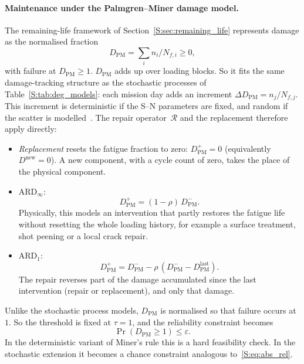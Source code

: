 \documentclass[11pt,a4paper]{article}
\theoremstyle{plain}
\theoremstyle{definition}
\theoremstyle{remark}
\begin{document}
\paragraph{Maintenance under the Palmgren--Miner damage model.}
The remaining-life framework of Section~\ref{S:sec:remaining_life} represents damage as the normalised fraction
\begin{equation}
  D_{\mathrm{PM}} = \sum_i n_i/N_{f,i} \ge 0,
\end{equation}
with failure at $D_{\mathrm{PM}} \ge 1$.
$D_{\mathrm{PM}}$ adds up over loading blocks.
So it fits the same damage-tracking structure as the stochastic processes of Table~\ref{S:tab:deg_models}: each mission day adds an increment $\Delta D_{\mathrm{PM}} = n_j / N_{f,j}$.
This increment is deterministic if the S--N parameters are fixed, and random if the scatter is modelled~\cite{MunizCalvente2022}.
The repair operator~$\mathcal{R}$ and the replacement therefore apply directly:
\begin{itemize}
  \item \emph{Replacement} resets the fatigue fraction to zero: $D_{\mathrm{PM}}^+ = 0$ (equivalently $D^{\mathrm{new}} = 0$).
    A new component, with a cycle count of zero, takes the place of the physical component.
  \item $\text{ARD}_\infty$:
    \begin{equation}
      D_{\mathrm{PM}}^+ = (1-\rho)\,D_{\mathrm{PM}}^-.
    \end{equation}
    Physically, this models an intervention that partly restores the fatigue life without resetting the whole loading history, for example a surface treatment, shot peening or a local crack repair.
  \item $\text{ARD}_1$:
    \begin{equation}
      D_{\mathrm{PM}}^+ = D_{\mathrm{PM}}^- - \rho\,(D_{\mathrm{PM}}^- - D_{\mathrm{PM}}^{\mathrm{last}}).
    \end{equation}
    The repair reverses part of the damage accumulated since the last intervention (repair or replacement), and only that damage.
\end{itemize}
Unlike the stochastic process models, $D_{\mathrm{PM}}$ is normalised so that failure occurs at~$1$.
So the threshold is fixed at $\tau = 1$, and the reliability constraint becomes
\begin{equation}
  \Pr(D_{\mathrm{PM}} \ge 1) \le \varepsilon.
\end{equation}
In the deterministic variant of Miner's rule this is a hard feasibility check.
In the stochastic extension it becomes a chance constraint analogous to~\eqref{S:eq:abs_rel}.
\end{document}
